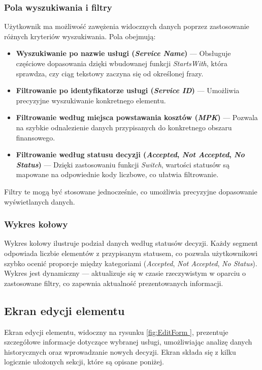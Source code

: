 \subsubsection*{Pola wyszukiwania i filtry}

Użytkownik ma możliwość zawężenia widocznych danych poprzez zastosowanie różnych kryteriów wyszukiwania. Pola obejmują:

\begin{itemize}
\item \textbf{Wyszukiwanie po nazwie usługi (\textit{Service Name})} — Obsługuje częściowe dopasowania dzięki wbudowanej funkcji \textit{StartsWith}, która sprawdza, czy ciąg tekstowy zaczyna się od określonej frazy.
\item \textbf{Filtrowanie po identyfikatorze usługi (\textit{Service ID})} — Umożliwia precyzyjne wyszukiwanie konkretnego elementu.
\item \textbf{Filtrowanie według miejsca powstawania kosztów (\textit{MPK})} — Pozwala na szybkie odnalezienie danych przypisanych do konkretnego obszaru finansowego.
\item \textbf{Filtrowanie według statusu decyzji (\textit{Accepted}, \textit{Not Accepted}, \textit{No Status})} — Dzięki zastosowaniu funkcji \textit{Switch}, wartości statusów są mapowane na odpowiednie kody liczbowe, co ułatwia filtrowanie.
\end{itemize}

Filtry te mogą być stosowane jednocześnie, co umożliwia precyzyjne dopasowanie wyświetlanych danych.

\subsubsection*{Wykres kołowy}

Wykres kołowy ilustruje podział danych według statusów decyzji. Każdy segment odpowiada liczbie elementów z przypisanym statusem, co pozwala użytkownikowi szybko ocenić proporcje między kategoriami (\textit{Accepted}, \textit{Not Accepted}, \textit{No Status}). Wykres jest dynamiczny — aktualizuje się w czasie rzeczywistym w oparciu o zastosowane filtry, co zapewnia aktualność prezentowanych informacji.

\subsection{Ekran edycji elementu}

Ekran edycji elementu, widoczny na rysunku \ref{fig:EditForm }, prezentuje szczegółowe informacje dotyczące wybranej usługi, umożliwiając analizę danych historycznych oraz wprowadzanie nowych decyzji. Ekran składa się z kilku logicznie ułożonych sekcji, które są opisane poniżej.

